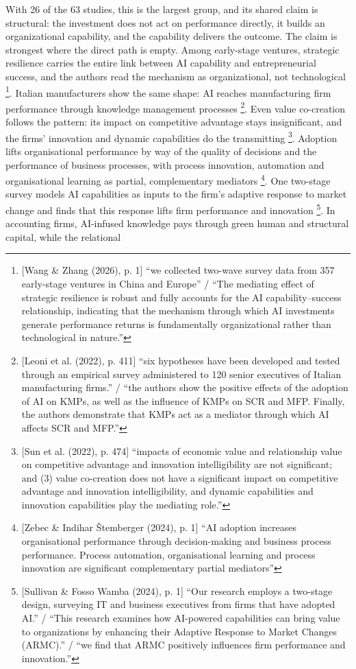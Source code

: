With 26 of the 63 studies, this is the largest group, and its shared claim is structural: the investment does not act on performance directly, it builds an organizational capability, and the capability delivers the outcome. The claim is strongest where the direct path is empty. Among early-stage ventures, strategic resilience carries the entire link between AI capability and entrepreneurial success, and the authors read the mechanism as organizational, not technological \parencite[p.~1]{wang2026artificial}\footnote{[Wang \& Zhang (2026), p. 1] ``we collected two-wave survey data from 357 early-stage ventures in China and Europe'' / ``The mediating effect of strategic resilience is robust and fully accounts for the AI capability--success relationship, indicating that the mechanism through which AI investments generate performance returns is fundamentally organizational rather than technological in nature.''}. Italian manufacturers show the same shape: AI reaches manufacturing firm performance through knowledge management processes \parencite[p.~411]{leoni2022mediating}\footnote{[Leoni et al. (2022), p. 411] ``six hypotheses have been developed and tested through an empirical survey administered to 120 senior executives of Italian manufacturing firms.'' / ``the authors show the positive effects of the adoption of AI on KMPs, as well as the influence of KMPs on SCR and MFP. Finally, the authors demonstrate that KMPs act as a mediator through which AI affects SCR and MFP.''}. Even value co-creation follows the pattern: its impact on competitive advantage stays insignificant, and the firms' innovation and dynamic capabilities do the transmitting \parencite[p.~474]{sun2022impact}\footnote{[Sun et al. (2022), p. 474] ``impacts of economic value and relationship value on competitive advantage and innovation intelligibility are not significant; and (3) value co-creation does not have a significant impact on competitive advantage and innovation intelligibility, and dynamic capabilities and innovation capabilities play the mediating role.''}. Adoption lifts organisational performance by way of the quality of decisions and the performance of business processes, with process innovation, automation and organisational learning as partial, complementary mediators \parencite[p.~1]{zebec2024creating}\footnote{[Zebec \& Indihar {\v S}temberger (2024), p. 1] ``AI adoption increases organisational performance through decision-making and business process performance. Process automation, organisational learning and process innovation are significant complementary partial mediators''}. One two-stage survey models AI capabilities as inputs to the firm's adaptive response to market change and finds that this response lifts firm performance and innovation \parencite[p.~1]{sullivan2024artificial}\footnote{[Sullivan \& Fosso Wamba (2024), p. 1] ``Our research employs a two-stage design, surveying IT and business executives from firms that have adopted AI.'' / ``This research examines how AI-powered capabilities can bring value to organizations by enhancing their Adaptive Response to Market Changes (ARMC).'' / ``we find that ARMC positively influences firm performance and innovation.''}. In accounting firms, AI-infused knowledge pays through green human and structural capital, while the relational 